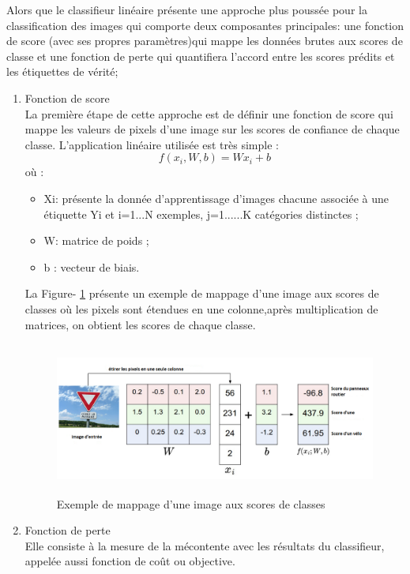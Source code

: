 Alors que le classifieur linéaire présente une approche plus poussée pour la classification des images qui comporte deux composantes principales: une fonction de score (avec ses propres paramètres)qui mappe les données brutes aux scores de classe et une fonction de perte qui quantifiera l'accord entre les scores prédits et les étiquettes de vérité;
\begin{enumerate}
    \item Fonction de score \\
    La première étape de cette approche est de définir une fonction de score qui mappe les valeurs de pixels d'une image sur les scores de confiance de chaque classe. L’application linéaire utilisée est très simple :\\
          \[f(x_i,W,b)=Wx_i+b\] où :
\begin{itemize}
    \item Xi: présente la donnée d’apprentissage d’images chacune associée à une étiquette Yi et i=1...N exemples, j=1......K catégories distinctes ;
   \item W: matrice de poids ;
    \item b : vecteur de biais.
\end{itemize}
 
La Figure- \ref{fig:map} présente un exemple de mappage d’une image aux scores de classes où les pixels sont étendues en une colonne,après multiplication de matrices, on obtient les scores de chaque classe.

\begin{figure}[h!]
      \centering
      \includegraphics[width=14cm,height=5cm]{images/pp2.png}
    \caption{Exemple de mappage d’une image aux scores de classes}
    \label{fig:map}
\end{figure}
\newpage
\item Fonction de perte\\
Elle consiste à la mesure de la mécontente avec les résultats du classifieur, appelée aussi fonction de coût ou objective.\\


\end{enumerate}
